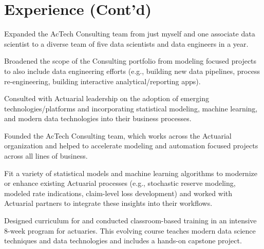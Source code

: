 \documentclass[letterpaper]{deedy-resume} %
\begin{document}

\begin{minipage}[t]{0.9\textwidth}

  \section{Experience (Cont'd)}
  
  \hfill
  \vspace{\topsep}
  \begin{tightitemize}
  \item  Expanded the AcTech Consulting team from just myself and one
    associate data scientist to a diverse team of five data scientists
    and data engineers in a year. 
  \item Broadened the scope of the Consulting portfolio from modeling focused projects to
    also include data engineering efforts (e.g., building new data
    pipelines, process re-engineering, building interactive
    analytical/reporting apps).
  \item Consulted with Actuarial leadership on the adoption of emerging
    technologies/platforms and incorporating statistical modeling,
    machine learning, and modern data technologies into their business
    processes.
  \end{tightitemize}
  \sectionspace
  
  \hfill{}
  \begin{tightitemize}
  \item   Founded the AcTech Consulting team, which works across the Actuarial
    organization and helped to accelerate modeling and automation
    focused projects across all lines of business. 
  \item Fit a variety of statistical models and machine learning
    algorithms to modernize or enhance existing Actuarial processes
    (e.g., stochastic reserve modeling, modeled rate indications, claim-level
    loss development) and worked with Actuarial partners to integrate
    these insights into their workflows.
  \item Designed curriculum for and conducted classroom-based training in an
    intensive 8-week program for actuaries. This evolving course teaches modern data
    science techniques and data technologies and includes a hands-on
    capstone project.
  \end{tightitemize}
  \sectionspace
  

\end{minipage}
\end{document}
